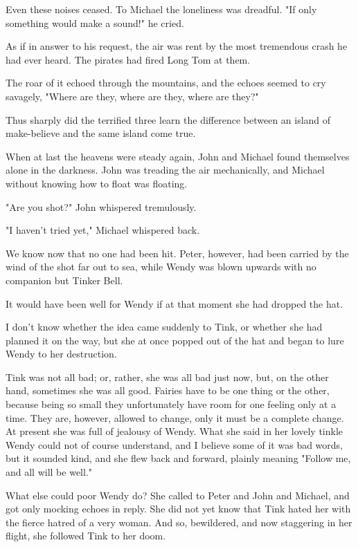 Even these noises ceased. To Michael the loneliness was dreadful. "If only
something would make a sound!" he cried.


As if in answer to his request, the air was rent by the most tremendous
crash he had ever heard. The pirates had fired Long Tom at them.


The roar of it echoed through the mountains, and the echoes seemed to cry
savagely, "Where are they, where are they, where are they?"


Thus sharply did the terrified three learn the difference between an
island of make-believe and the same island come true.


When at last the heavens were steady again, John and Michael found
themselves alone in the darkness. John was treading the air mechanically,
and Michael without knowing how to float was floating.


"Are you shot?" John whispered tremulously.


"I haven't tried yet," Michael whispered back.


We know now that no one had been hit. Peter, however, had been carried by
the wind of the shot far out to sea, while Wendy was blown upwards with no
companion but Tinker Bell.


It would have been well for Wendy if at that moment she had dropped the
hat.


I don't know whether the idea came suddenly to Tink, or whether she had
planned it on the way, but she at once popped out of the hat and began to
lure Wendy to her destruction.


Tink was not all bad; or, rather, she was all bad just now, but, on the
other hand, sometimes she was all good. Fairies have to be one thing or
the other, because being so small they unfortunately have room for one
feeling only at a time. They are, however, allowed to change, only it must
be a complete change. At present she was full of jealousy of Wendy. What
she said in her lovely tinkle Wendy could not of course understand, and I
believe some of it was bad words, but it sounded kind, and she flew back
and forward, plainly meaning "Follow me, and all will be well."


What else could poor Wendy do? She called to Peter and John and Michael,
and got only mocking echoes in reply. She did not yet know that Tink hated
her with the fierce hatred of a very woman. And so, bewildered, and now
staggering in her flight, she followed Tink to her doom.

